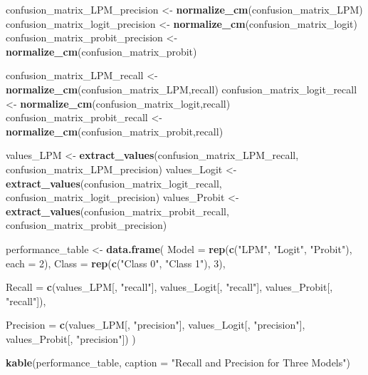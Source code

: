 \documentclass[
]{article}
\newenvironment{Shaded}{\begin{snugshade}}{\end{snugshade}}
\newcommand{\AttributeTok}[1]{\textcolor[rgb]{0.13,0.29,0.53}{#1}}
\newcommand{\DecValTok}[1]{\textcolor[rgb]{0.00,0.00,0.81}{#1}}
\newcommand{\FunctionTok}[1]{\textcolor[rgb]{0.13,0.29,0.53}{\textbf{#1}}}
\newcommand{\NormalTok}[1]{#1}
\newcommand{\OtherTok}[1]{\textcolor[rgb]{0.56,0.35,0.01}{#1}}
\newcommand{\StringTok}[1]{\textcolor[rgb]{0.31,0.60,0.02}{#1}}
\begin{document}
\begin{Shaded}
\begin{Highlighting}[]
\NormalTok{confusion\_matrix\_LPM\_precision }\OtherTok{\textless{}{-}} \FunctionTok{normalize\_cm}\NormalTok{(confusion\_matrix\_LPM)}
\NormalTok{confusion\_matrix\_logit\_precision }\OtherTok{\textless{}{-}} \FunctionTok{normalize\_cm}\NormalTok{(confusion\_matrix\_logit)}
\NormalTok{confusion\_matrix\_probit\_precision }\OtherTok{\textless{}{-}} \FunctionTok{normalize\_cm}\NormalTok{(confusion\_matrix\_probit)}

\NormalTok{confusion\_matrix\_LPM\_recall }\OtherTok{\textless{}{-}} \FunctionTok{normalize\_cm}\NormalTok{(confusion\_matrix\_LPM,}\StringTok{\textquotesingle{}recall\textquotesingle{}}\NormalTok{)}
\NormalTok{confusion\_matrix\_logit\_recall }\OtherTok{\textless{}{-}} \FunctionTok{normalize\_cm}\NormalTok{(confusion\_matrix\_logit,}\StringTok{\textquotesingle{}recall\textquotesingle{}}\NormalTok{)}
\NormalTok{confusion\_matrix\_probit\_recall }\OtherTok{\textless{}{-}} \FunctionTok{normalize\_cm}\NormalTok{(confusion\_matrix\_probit,}\StringTok{\textquotesingle{}recall\textquotesingle{}}\NormalTok{)}

\NormalTok{values\_LPM }\OtherTok{\textless{}{-}} \FunctionTok{extract\_values}\NormalTok{(confusion\_matrix\_LPM\_recall,}
\NormalTok{                             confusion\_matrix\_LPM\_precision)}
\NormalTok{values\_Logit }\OtherTok{\textless{}{-}} \FunctionTok{extract\_values}\NormalTok{(confusion\_matrix\_logit\_recall,}
\NormalTok{                               confusion\_matrix\_logit\_precision)}
\NormalTok{values\_Probit }\OtherTok{\textless{}{-}} \FunctionTok{extract\_values}\NormalTok{(confusion\_matrix\_probit\_recall,}
\NormalTok{                                confusion\_matrix\_probit\_precision)}

\NormalTok{performance\_table }\OtherTok{\textless{}{-}} \FunctionTok{data.frame}\NormalTok{(}
  \AttributeTok{Model =} \FunctionTok{rep}\NormalTok{(}\FunctionTok{c}\NormalTok{(}\StringTok{"LPM"}\NormalTok{, }\StringTok{"Logit"}\NormalTok{, }\StringTok{"Probit"}\NormalTok{), }\AttributeTok{each =} \DecValTok{2}\NormalTok{),}
  \AttributeTok{Class =} \FunctionTok{rep}\NormalTok{(}\FunctionTok{c}\NormalTok{(}\StringTok{"Class 0"}\NormalTok{, }\StringTok{"Class 1"}\NormalTok{), }\DecValTok{3}\NormalTok{),}
  
  \AttributeTok{Recall =} \FunctionTok{c}\NormalTok{(values\_LPM[, }\StringTok{"recall"}\NormalTok{], }
\NormalTok{             values\_Logit[, }\StringTok{"recall"}\NormalTok{], }
\NormalTok{             values\_Probit[, }\StringTok{"recall"}\NormalTok{]),}
  
  \AttributeTok{Precision =} \FunctionTok{c}\NormalTok{(values\_LPM[, }\StringTok{"precision"}\NormalTok{],}
\NormalTok{                values\_Logit[, }\StringTok{"precision"}\NormalTok{], }
\NormalTok{                values\_Probit[, }\StringTok{"precision"}\NormalTok{])}
\NormalTok{)}


\FunctionTok{kable}\NormalTok{(performance\_table, }\AttributeTok{caption =} \StringTok{"Recall and Precision for Three Models"}\NormalTok{)}
\end{Highlighting}
\end{Shaded}
\end{document}
